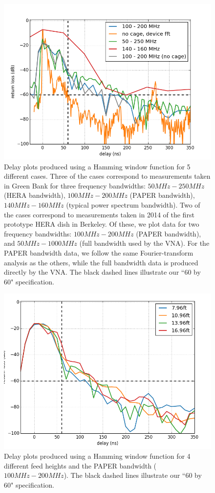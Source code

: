 \documentclass[12pt,preprint]{aastex}
\begin{document}
\begin{figure}[ht!]
\centering
\includegraphics[totalheight=0.4\textheight]{plots/delay3_window.png}
\caption{Delay plots produced using a Hamming window function for 5 different cases. Three of the cases correspond to measurements taken in Green Bank for three frequency bandwidths: $50MHz-250MHz$ (HERA bandwidth), $100MHz-200MHz$ (PAPER bandwidth), $140MHz-160MHz$ (typical power spectrum bandwidth). Two of the cases correspond to measurements taken in 2014 of the first prototype HERA dish in Berkeley. Of these, we plot data for two frequency bandwidths: $100MHz-200MHz$ (PAPER bandwidth), and $50MHz-1000MHz$ (full bandwidth used by the VNA). For the PAPER bandwidth data, we follow the same Fourier-transform analysis as the others, while the full bandwidth data is produced directly by the VNA. The black dashed lines illustrate our ``60 by 60" specification.}
\label{fig:3bands}
\end{figure}

\begin{figure}[ht!]
\centering
\includegraphics[totalheight=0.4\textheight]{plots/delay_heights_paper.png}
\caption{Delay plots produced using a Hamming window function for 4 different feed heights and the PAPER bandwidth ($100MHz-200MHz$). The black dashed lines illustrate our ``60 by 60" specification.}
\label{fig:elevator}
\end{figure}
\end{document}
